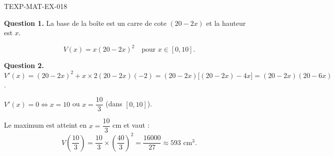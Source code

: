 \begin{corrige}{TEXP-MAT-EX-018}

\textbf{Question 1.} La base de la boîte est un carre de cote $(20 - 2x)$ et la hauteur est $x$.


\[ V(x) = x(20 - 2x)^2 \quad \text{pour } x \in [0, 10]. \]

\textbf{Question 2.} $V'(x) = (20-2x)^2 + x \times 2(20-2x)(-2) = (20-2x)\bigl[(20-2x) - 4x\bigr] = (20-2x)(20-6x)$.

$V'(x) = 0 \iff x = 10$ ou $x = \dfrac{10}{3}$ (dans $[0,10]$).

Le maximum est atteint en $x = \dfrac{10}{3}$ cm et vaut :
\[ V\!\left(\dfrac{10}{3}\right) = \dfrac{10}{3} \times \left(\dfrac{40}{3}\right)^2 = \dfrac{16000}{27} \approx 593 \text{ cm}^3. \]

\end{corrige}
